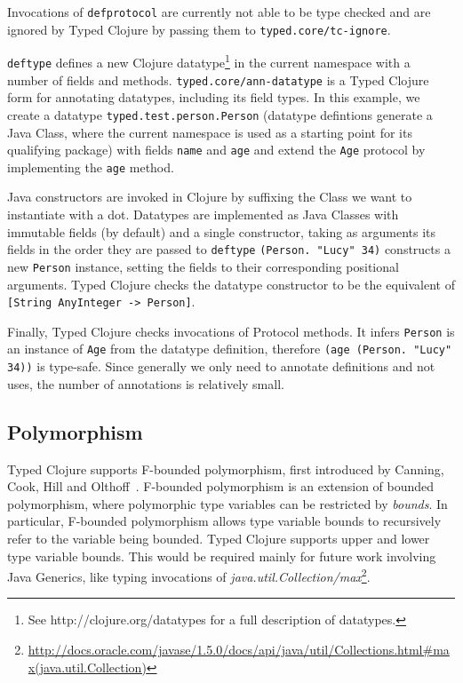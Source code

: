 Invocations of \lstinline|defprotocol| are currently not able to be type checked
and are ignored by Typed Clojure by passing them to \lstinline|typed.core/tc-ignore|.

\lstinline|deftype|
defines a new Clojure datatype\footnote{See http://clojure.org/datatypes for a full description of datatypes.}
in the current namespace with a number of fields and methods. 
\lstinline|typed.core/ann-datatype| is a Typed Clojure form for annotating datatypes, including its field types.
In this example, we create a datatype \lstinline|typed.test.person.Person|
(datatype defintions generate a Java Class, where the current namespace is used as a starting point for its
qualifying package)
with fields \lstinline|name| and \lstinline|age| and 
extend the \lstinline|Age| protocol by implementing the \lstinline|age| method.

Java constructors are invoked in Clojure by suffixing the Class we want to instantiate with a dot.
Datatypes are implemented as Java Classes with immutable fields (by default) and a single constructor, taking as arguments its fields 
in the order they are passed to \lstinline|deftype|
\lstinline|(Person. "Lucy" 34)| constructs a new \lstinline|Person|
instance, setting the fields to their corresponding positional arguments.
Typed Clojure checks the datatype constructor to be the equivalent of 
\lstinline|[String AnyInteger -> Person]|.

Finally, Typed Clojure checks invocations of Protocol methods. It infers \lstinline|Person|
is an instance of \lstinline|Age| from the datatype definition, therefore \lstinline|(age (Person. "Lucy" 34))| is type-safe.
Since generally we only need to annotate definitions and not uses, the number of annotations is relatively small.

\subsection{Polymorphism}

Typed Clojure supports F-bounded polymorphism, first introduced by Canning, Cook, Hill and Olthoff~\cite{CCHOM89}. 
F-bounded polymorphism is an extension of bounded polymorphism, where polymorphic type variables
can be restricted by \emph{bounds}.
In particular, F-bounded polymorphism allows type variable bounds to recursively refer to the
variable being bounded. Typed Clojure supports upper and lower type variable bounds.
This would be required mainly for future work involving Java Generics, like typing
invocations of \emph{java.util.Collection/max}\footnote{\url{http://docs.oracle.com/javase/1.5.0/docs/api/java/util/Collections.html#max(java.util.Collection)}}.

